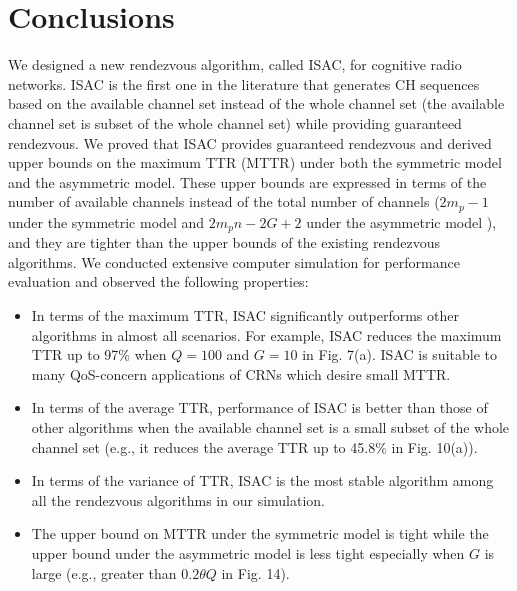 \documentclass[journal]{IEEEtran}
\begin{document}
\section{Conclusions}
We designed a new rendezvous algorithm, called ISAC, for cognitive radio networks. ISAC is the first one in the literature that generates CH sequences based on the available channel set instead of the whole channel set (the available channel set is subset of the whole channel set) while providing guaranteed rendezvous. We proved that ISAC provides guaranteed rendezvous and derived upper bounds on the maximum TTR (MTTR) under both the symmetric model and the asymmetric model. These upper bounds are expressed in terms of the number of available channels instead of the total number of channels ($2m_p-1$ under the symmetric model and $2m_pn-2G+2$ under the asymmetric model ), and  they are tighter than the upper bounds of the existing rendezvous algorithms. We conducted extensive computer simulation for performance evaluation and observed the following properties:
\begin{itemize}
\item In terms of the maximum TTR, ISAC significantly outperforms other algorithms in almost all scenarios. For example, ISAC reduces the maximum TTR up to 97\% when $Q=100$ and $G=10$ in Fig. 7(a). ISAC is suitable to many QoS-concern applications of CRNs which desire small MTTR.
\item In terms of the average TTR, performance of ISAC is better than those of other algorithms when the available channel set is a small subset of the whole channel set (e.g., it reduces the average TTR up to 45.8\% in Fig. 10(a)).
\item In terms of the variance of TTR, ISAC is the most stable algorithm among all the rendezvous algorithms in our simulation.
\item The upper bound on MTTR under the symmetric model is tight while the upper bound under the asymmetric model is less tight especially when $G$ is large (e.g., greater than $0.2\theta Q$ in Fig. 14).
\end{itemize}
\end{document}
